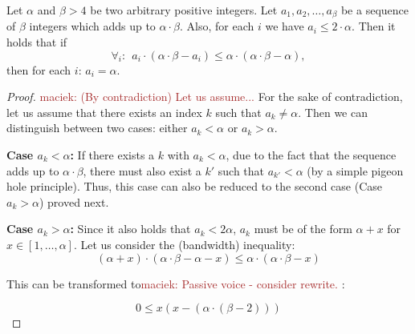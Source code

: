 \documentclass[9pt]{sigcomm-alternate}
\newcommand{\maciek}[1]{\textcolor{brown}{maciek: #1}}
\newcommand{\clauses}{\alpha}
\newcommand{\variables}{\beta}
\begin{document}
\begin{appendix}
\begin{lemma}\label{lem:bandwidth-lemma}
  Let $\clauses$ and $\variables > 4$ be two arbitrary positive integers. Let $a_1, a_2, \ldots,
  a_{\variables}$ be a sequence of $\variables$ integers which adds up to $\clauses \cdot \variables$. Also, for
  each $i$ we have $a_i \leq 2 \cdot \clauses$. Then it holds that if
  $$ \forall_i:~~ a_i \cdot (\clauses \cdot \variables - a_i) \leq \clauses \cdot (\clauses \cdot \variables -
  \clauses), $$
\noindent  then for each $i$: $a_i = \clauses$.
\end{lemma}
\begin{proof}
  \maciek{(By contradiction) Let us assume...}
For the sake of contradiction, let us assume that there exists an index $k$ such that
$a_k \neq \clauses$. Then we can distinguish between two cases:
either $a_k<\clauses$ or
$a_k>\clauses$.

\textbf{Case $a_k<\clauses$:} If there exists a $k$ with $a_k<\clauses$,
due to the fact that the sequence adds up to $\clauses \cdot \variables$,
there must also exist a $k'$ such that $a_{k'}<\clauses$ (by a simple
pigeon hole principle). Thus, this case can
also be reduced to the second case (Case $a_k>\clauses$) proved
next.

\textbf{Case $a_k>\clauses$:} Since it also holds that $a_k < 2\clauses$,
$a_k$ must be of the form $\clauses + x$ for $x \in [1, \ldots, \clauses]$.
Let us consider the (bandwidth) inequality:
$$ (\clauses + x) \cdot (\clauses \cdot \variables - \clauses - x) \leq \clauses \cdot (\clauses \cdot \variables - x) $$

This can be transformed to\maciek{Passive voice - consider rewrite.}
:

$$ 0 \leq x(x - (\clauses \cdot (\variables - 2))) $$


\end{proof}
\end{appendix}
\end{document}
